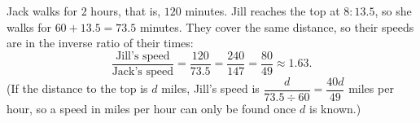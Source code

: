 Jack walks for $2$ hours, that is, $120$ minutes. Jill reaches the top at $8{:}13.5$, so she walks for $60+13.5=73.5$ minutes. They cover the same distance, so their speeds are in the inverse ratio of their times:
\[\dfrac{\text{Jill's speed}}{\text{Jack's speed}}=\dfrac{120}{73.5}=\dfrac{240}{147}=\boxed{\dfrac{80}{49}\approx1.63}.\]
(If the distance to the top is $d$ miles, Jill's speed is $\dfrac{d}{73.5\div60}=\dfrac{40d}{49}$ miles per hour, so a speed in miles per hour can only be found once $d$ is known.)
